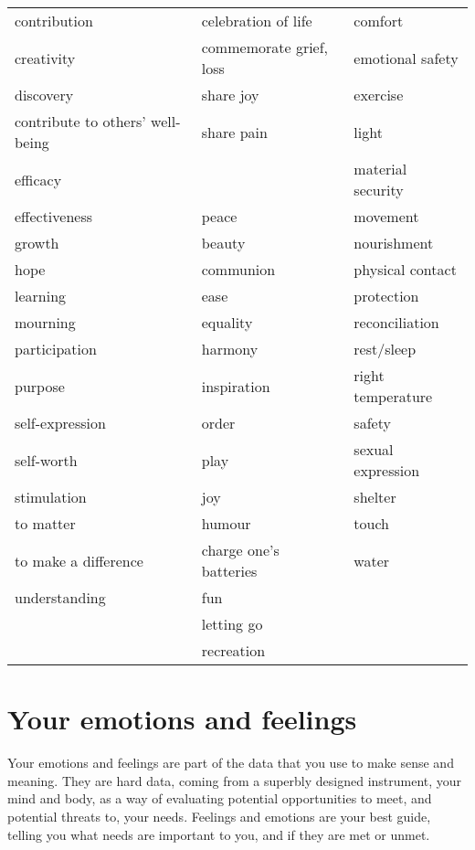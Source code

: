 \begin{small}
\begin{longtable}{L{0.33\textwidth}  L{0.33\textwidth}  L{0.22\textwidth} }
                contribution & celebration of life & comfort \\
                creativity & commemorate grief, loss & emotional safety\\
                discovery & share joy & exercise\\
                contribute to others’ well-being & share pain & light \\
                efficacy & & material security \\
                effectiveness & peace & movement \\
                growth & beauty & nourishment \\
                hope & communion & physical contact \\
                learning & ease & protection \\
                mourning & equality & reconciliation \\
                participation & harmony & rest/sleep \\
                purpose & inspiration & right temperature \\
                self-expression & order & safety \\
                self-worth & play & sexual expression \\
                stimulation & joy & shelter \\
                to matter & humour & touch\\
                to make a difference & charge one's batteries & water \\
                understanding & fun & \\
                & letting go & \\
                & recreation & \\
                \bottomrule
        \end{longtable}
\end{small}


\section{Your emotions and feelings}
Your emotions and feelings are part of  the data that you use to make sense and meaning. They are hard data, coming from a superbly designed instrument, your mind and body, as a way of evaluating potential opportunities to meet, and potential threats to, your needs. Feelings and emotions are your best guide, telling you what needs are important to you, and if they are met or unmet.


